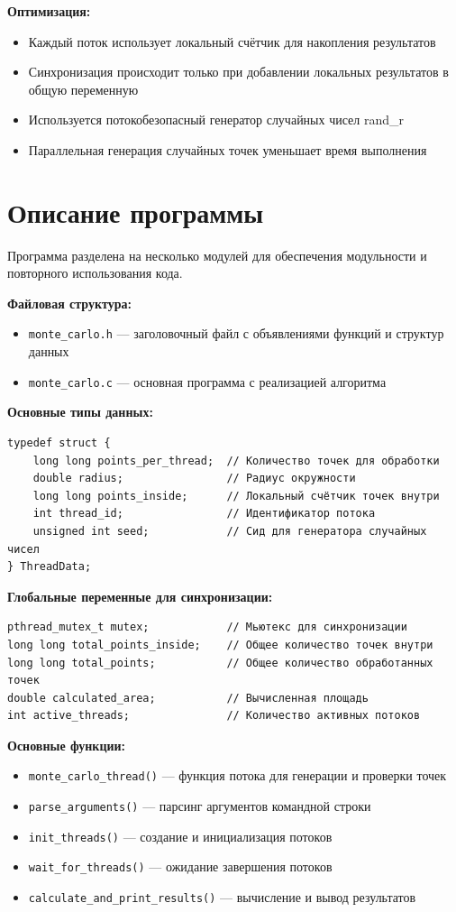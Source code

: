 {\bfseries Оптимизация:}
\begin{itemize}
    \item Каждый поток использует локальный счётчик для накопления результатов
    \item Синхронизация происходит только при добавлении локальных результатов в общую переменную
    \item Используется потокобезопасный генератор случайных чисел rand\_r
    \item Параллельная генерация случайных точек уменьшает время выполнения
\end{itemize}

\section{Описание программы}
Программа разделена на несколько модулей для обеспечения модульности и повторного использования кода.

{\bfseries Файловая структура:}
\begin{itemize}
    \item \texttt{monte\_carlo.h} — заголовочный файл с объявлениями функций и структур данных
    \item \texttt{monte\_carlo.c} — основная программа с реализацией алгоритма
\end{itemize}

{\bfseries Основные типы данных:}
\begin{verbatim}
typedef struct {
    long long points_per_thread;  // Количество точек для обработки
    double radius;                // Радиус окружности
    long long points_inside;      // Локальный счётчик точек внутри
    int thread_id;                // Идентификатор потока
    unsigned int seed;            // Сид для генератора случайных чисел
} ThreadData;
\end{verbatim}

{\bfseries Глобальные переменные для синхронизации:}
\begin{verbatim}
pthread_mutex_t mutex;            // Мьютекс для синхронизации
long long total_points_inside;    // Общее количество точек внутри
long long total_points;           // Общее количество обработанных точек
double calculated_area;           // Вычисленная площадь
int active_threads;               // Количество активных потоков
\end{verbatim}

{\bfseries Основные функции:}
\begin{itemize}
    \item \texttt{monte\_carlo\_thread()} — функция потока для генерации и проверки точек
    \item \texttt{parse\_arguments()} — парсинг аргументов командной строки
    \item \texttt{init\_threads()} — создание и инициализация потоков
    \item \texttt{wait\_for\_threads()} — ожидание завершения потоков
    \item \texttt{calculate\_and\_print\_results()} — вычисление и вывод результатов
\end{itemize}

